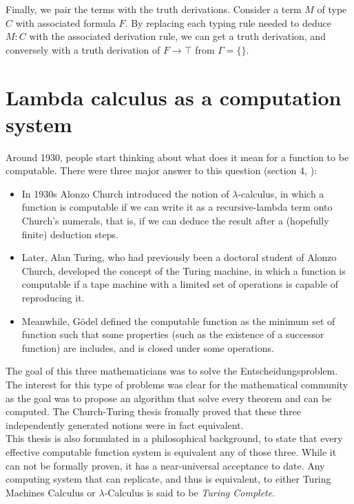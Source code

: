 Finally, we pair the terms  with the truth derivations. Consider a term $M$ of type $C$ with associated formula $F$. By replacing each typing rule needed to deduce $M:C$  with the associated derivation rule, we can get a truth derivation, and conversely with a truth derivation of $F\to \top$ from $\Gamma=\{\}$.\\



\section{Lambda calculus as a computation system}
Around 1930, people start thinking about what does it mean for a function to be computable. There were three major answer to this question (section 4, \cite{cardone2006history}):
\begin{itemize}
\item In 1930s Alonzo Church introduced the notion of $\lambda$-calculus, in which a function is computable if we can write it as a recursive-lambda term onto Church's numerals, that is, if we can deduce the result after a (hopefully finite) deduction steps.
\item Later, Alan Turing, who had previously been a doctoral student of Alonzo Church, developed the concept of the Turing machine, in which a function is computable if a tape machine with a limited set of operations is capable of reproducing it.
\item Meanwhile, Gödel defined the computable function as the minimum set of function such that some properties (such as the existence of a successor function) are includes, and is closed under some operations. 
\end{itemize}

The goal of this three mathematicians was to solve the Entscheidungsproblem\cite{hilbert1999principles}.\\

The interest for this type of problems was clear for the mathematical community as the goal was to propose an algorithm that solve every theorem and can be computed. The Church-Turing thesis fromally proved that these three independently generated notions were in fact equivalent\cite{copeland1997church}.\\


This thesis is also formulated in a philosophical background, to state that every effective computable function system is equivalent any of  those three. While it can not be formally proven, it has a near-universal acceptance to date. Any computing system that can replicate, and thus is equivalent, to either Turing Machines Calculus or $\lambda$-Calculus is said to be \emph{Turing Complete}.\\


